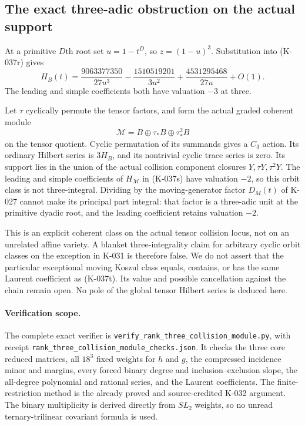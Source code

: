 \subsection*{The exact three-adic obstruction on the actual support}

At a primitive $D$th root set $u=1-t^D$, so $z=(1-u)^3$.
Substitution into (K-037r) gives
\[
 H_B(t)=\frac{9063377350}{27u^3}
           -\frac{1510519201}{3u^2}
           +\frac{4531295468}{27u}+O(1).                  \tag{K-037s}
\]
The leading and simple coefficients both have valuation $-3$
at three.

Let $\tau$ cyclically permute the tensor factors, and form
the actual graded coherent module
\[
                    \mathcal M=B\oplus\tau_*B\oplus\tau_*^2B
                                                            \tag{K-037t}
\]
on the tensor quotient. Cyclic permutation of its summands
gives a $C_3$ action. Its ordinary Hilbert series is $3H_B$,
and its nontrivial cyclic trace series is zero. Its support
lies in the union of the actual collision component
closures $Y,\tau Y,\tau^2Y$. The leading and simple
coefficients of $H_{\mathcal M}$ in (K-037s) have valuation
$-2$, so this orbit class is not three-integral.
Dividing by the moving-generator factor $D_M(t)$ of
K-027 cannot make its principal part integral: that
factor is a three-adic unit at the primitive dyadic
root, and the leading coefficient retains valuation $-2$.

This is an explicit coherent class on the actual tensor
collision locus, not on an unrelated affine variety.
A blanket three-integrality claim for arbitrary cyclic
orbit classes on the exception in K-031 is therefore
false. We do not assert that the particular exceptional
moving Koszul class equals, contains, or has the same
Laurent coefficient as (K-037t). Its value and possible
cancellation against the chain remain open. No pole
of the global tensor Hilbert series is deduced here.

\paragraph{Verification scope.}
The complete exact verifier is
\nolinkurl{verify_rank_three_collision_module.py}, with
receipt \nolinkurl{rank_three_collision_module_checks.json}.
It checks the three core reduced matrices, all $18^3$
fixed weights for $h$ and $g$, the compressed incidence
minor and margins, every forced binary degree and
inclusion--exclusion slope, the all-degree polynomial
and rational series, and the Laurent coefficients.
The finite-restriction method is the already proved
and source-credited K-032 argument. The binary
multiplicity is derived directly from $SL_2$ weights,
so no unread ternary-trilinear covariant formula is used.

